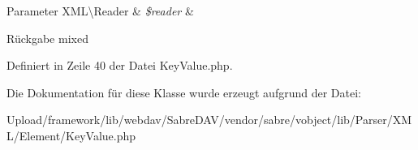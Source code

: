 \begin{DoxyParams}[1]{Parameter}
X\+M\+L\textbackslash{}\+Reader & {\em \$reader} & \\
\hline
\end{DoxyParams}
\begin{DoxyReturn}{Rückgabe}
mixed 
\end{DoxyReturn}


Definiert in Zeile 40 der Datei Key\+Value.\+php.



Die Dokumentation für diese Klasse wurde erzeugt aufgrund der Datei\+:\begin{DoxyCompactItemize}
\item 
Upload/framework/lib/webdav/\+Sabre\+D\+A\+V/vendor/sabre/vobject/lib/\+Parser/\+X\+M\+L/\+Element/Key\+Value.\+php\end{DoxyCompactItemize}
